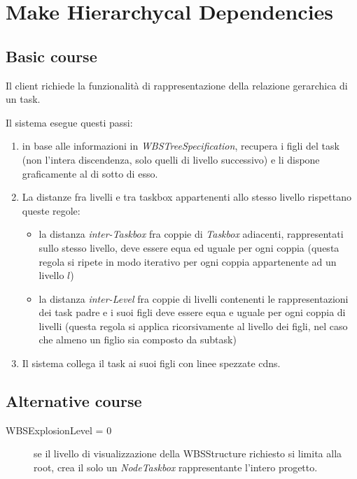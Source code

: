 \section{Make Hierarchycal Dependencies}
\label{seq:makeHierarchycalDependencies}
\subsection{Basic course}
Il client richiede la funzionalità di rappresentazione della relazione 
gerarchica di un task.

Il sistema esegue questi passi:
\begin{enumerate}
  \item in base alle informazioni in \emph{WBSTreeSpecification}, recupera i
  figli del task (non l’intera discendenza, solo quelli di livello successivo) e
  li dispone graficamente al di sotto di esso.
  \item La distanze fra livelli e tra taskbox appartenenti allo stesso
  livello rispettano queste regole:
  \begin{itemize}
    \item la distanza \emph{inter-Taskbox} fra coppie di
    \emph{Taskbox} adiacenti, rappresentati sullo stesso livello, deve essere
    equa ed uguale per ogni coppia (questa regola si ripete in modo iterativo
    per ogni coppia appartenente ad un livello $l$)
	\item la distanza \emph{inter-Level} fra coppie di livelli contenenti le 
	rappresentazioni dei task padre e i suoi figli deve essere equa e uguale
	per ogni coppia di livelli (questa regola si applica ricorsivamente al livello
	dei figli, nel caso che almeno un figlio sia composto da subtask)
  \end{itemize} 
  
  \item Il sistema collega il task ai suoi figli con linee spezzate cdns.
\end{enumerate}

\subsection{Alternative course}
\begin{description}
\item[WBSExplosionLevel = 0] se il livello di visualizzazione della WBSStructure
richiesto si limita alla root, crea il solo un \emph{NodeTaskbox} rappresentante
l’intero progetto.
\end{description}

